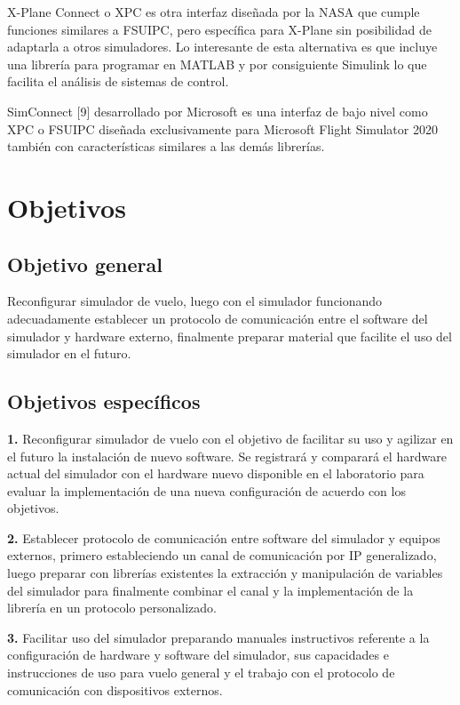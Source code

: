 \documentclass[12pt]{report}
\begin{document}
X-Plane Connect o XPC es otra interfaz diseñada por la NASA que cumple funciones similares a FSUIPC, pero específica para X-Plane sin posibilidad de adaptarla a otros simuladores. Lo interesante de esta alternativa es que incluye una librería para programar en MATLAB y por consiguiente Simulink lo que facilita el análisis de sistemas de control.

SimConnect [9] desarrollado por Microsoft es una interfaz de bajo nivel como XPC o FSUIPC diseñada exclusivamente para Microsoft Flight Simulator 2020 también con características similares a las demás librerías.

\chapter{Objetivos}

\section{Objetivo general}

Reconfigurar simulador de vuelo, luego con el simulador funcionando adecuadamente establecer un protocolo de comunicación entre el software del simulador y hardware externo, finalmente preparar material que facilite el uso del simulador en el futuro.

\section {Objetivos específicos}

\textbf{1.} Reconfigurar simulador de vuelo con el objetivo de facilitar su uso y agilizar en el futuro la instalación de nuevo software. Se registrará y comparará el hardware actual del simulador con el hardware nuevo disponible en el laboratorio para evaluar la implementación de una nueva configuración de acuerdo con los objetivos.

\textbf{2.} Establecer protocolo de comunicación entre software del simulador y equipos externos, primero estableciendo un canal de comunicación por IP generalizado, luego preparar con librerías existentes la extracción y manipulación de variables del simulador para finalmente combinar el canal y la implementación de la librería en un protocolo personalizado.

\textbf{3.} Facilitar uso del simulador preparando manuales instructivos referente a la configuración de hardware y software del simulador, sus capacidades e instrucciones de uso para vuelo general y el trabajo con el protocolo de comunicación con dispositivos externos. 
\end{document}
